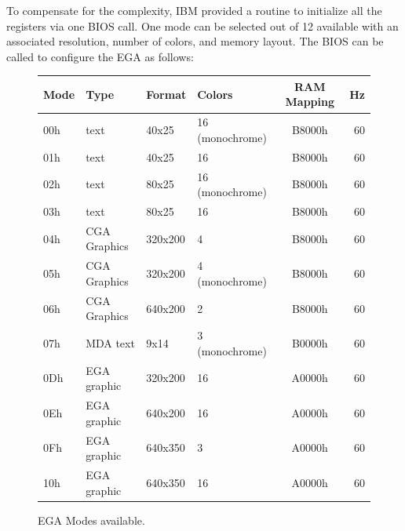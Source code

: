 \documentclass[book.tex]{subfiles}
\begin{document}
\par
To compensate for the complexity, IBM provided a routine to initialize all the registers via one BIOS call. One mode can be selected out of 12 available with an associated resolution, number of colors, and memory layout. The BIOS can be called to configure the EGA as follows:
\vspace{-10pt}
\begin{figure}[H]
\centering
\begin{table}[H]
\begin{tabularx}{\textwidth}[c]{llllcr}
\hline
\textbf{Mode} & \textbf{Type} & \textbf{Format} & \textbf{Colors} & \hspace{10pt}\textbf{RAM Mapping}\hspace{10pt} & \textbf{Hz}        \\ \hline
00h             & text          & 40x25           & 16 (monochrome) & B8000h     & 60                           \\ \hline
01h             & text          & 40x25           & 16              & B8000h    & 60                            \\ \hline
02h             & text          & 80x25           & 16 (monochrome) & B8000h    & 60                            \\ \hline
03h             & text          & 80x25           & 16              & B8000h    & 60                            \\ \hline
04h             & CGA Graphics  & 320x200         & 4               & B8000h    & 60                            \\ \hline
05h             & CGA Graphics  & 320x200         & 4 (monochrome)  & B8000h    & 60                            \\ \hline
06h             & CGA Graphics  & 640x200         & 2               & B8000h    & 60                            \\ \hline
07h             & MDA text      & 9x14            & 3 (monochrome)  & B0000h    & 60                            \\ \hline
0Dh           & EGA graphic   & 320x200         & 16              & A0000h    & 60                            \\ \hline
0Eh           & EGA graphic   & 640x200         & 16              & A0000h    & 60                            \\ \hline
0Fh           & EGA graphic   & 640x350         & 3               & A0000h    & 60                            \\ \hline
10h           & EGA graphic   & 640x350         & 16              & A0000h    & 60                            \\ \hline
\end{tabularx}
\end{table}
\caption{EGA Modes available.}
\label{ega-modes-available}
 \end{figure}
 
\end{document}
